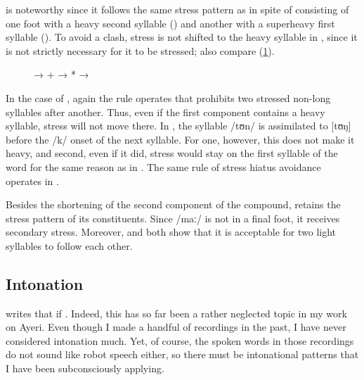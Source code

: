  is noteworthy since it follows the same stress
pattern as  in spite of consisting of one foot with
a heavy second syllable () and another with a superheavy
first syllable (). To avoid a clash, stress is not shifted
to the heavy syllable in , since it is not strictly
necessary for it to be stressed; also compare (\ref{ex:depangcati}).

\begin{figure}[h]
\pex\label{ex:depangcati}
\a * → 
\a {} +  → *
\a * → 
\xe
\end{figure}

In the case of , again the rule operates that
prohibits two stressed non-long syllables after another. Thus, even if the
first component  contains a heavy syllable, stress will not
move there. In , the syllable /tʊn/ is assimilated
 to [tʊŋ] before the /k/ onset of the next
syllable. For one, however, this does not make it heavy, and second, even if it
did, stress would stay on the first syllable of the word for the same reason as
in . The same rule of stress hiatus avoidance
operates in .

Besides the shortening of the second component of the compound, 
 retains the stress pattern of its constituents.
Since /maː/ is not in a final foot, it receives secondary stress. Moreover,
 and  both show that 
it is acceptable for two light syllables to follow each other.


\subsection{Intonation}

\citet{peterson2015} writes that if . Indeed, this has so far been a rather neglected topic in my work on
Ayeri. Even though I made a handful of recordings in the past, I have never
considered intonation much. Yet, of course, the spoken words in those
recordings do not sound like robot speech either, so there must be intonational
patterns that I have been subconsciously applying.

